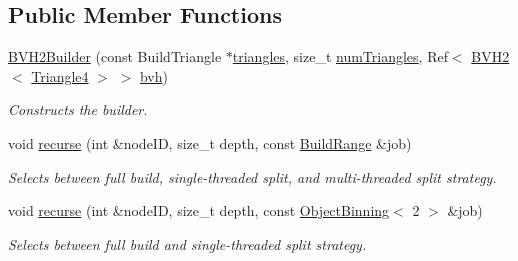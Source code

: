 \subsection*{Public Member Functions}
\begin{DoxyCompactItemize}
\item 
\hyperlink{classembree_1_1_b_v_h2_builder_a1316098392a9aceb491790843740172c}{BVH2Builder} (const BuildTriangle $\ast$\hyperlink{classembree_1_1_b_v_h2_builder_afd3fecbcf0fdc61b11eedd12c4f4f590}{triangles}, size\_\-t \hyperlink{classembree_1_1_b_v_h2_builder_a2abbd7a4aaa44e93f4eadbcff1eb9ac3}{numTriangles}, Ref$<$ \hyperlink{classembree_1_1_b_v_h2}{BVH2}$<$ \hyperlink{structembree_1_1_triangle4}{Triangle4} $>$ $>$ \hyperlink{classembree_1_1_b_v_h2_builder_ac904eaa6d0a4172a1b4fb63d4948ea17}{bvh})
\begin{DoxyCompactList}\small\item\em Constructs the builder. \item\end{DoxyCompactList}\item 
void \hyperlink{classembree_1_1_b_v_h2_builder_a6d5df7c4706a067f149707d890c34af6}{recurse} (int \&nodeID, size\_\-t depth, const \hyperlink{structembree_1_1_build_range}{BuildRange} \&job)
\begin{DoxyCompactList}\small\item\em Selects between full build, single-\/threaded split, and multi-\/threaded split strategy. \item\end{DoxyCompactList}\item 
void \hyperlink{classembree_1_1_b_v_h2_builder_a0922e6db988c9613b9d1f7959edc1142}{recurse} (int \&nodeID, size\_\-t depth, const \hyperlink{classembree_1_1_object_binning}{ObjectBinning}$<$ 2 $>$ \&job)
\begin{DoxyCompactList}\small\item\em Selects between full build and single-\/threaded split strategy. \item\end{DoxyCompactList}\end{DoxyCompactItemize}
